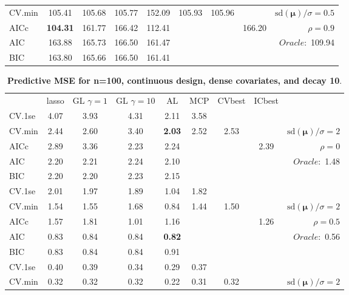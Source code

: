 \begin{table}
\begin{center}
\begin{tabular}{l*{7}{c}|r}
CV.min & 105.41 & 105.68 & 105.77 & 152.09 & 105.93 & 105.96 & & $\mathrm{sd}(\mathbf{\mu})/\sigma=0.5$ \\
AICc & {\bf 104.31} & 161.77 & 166.42 & 112.41 & & & 166.20 &  $\rho=0.9$ \\
AIC & 163.88 & 165.73 & 166.50 & 161.47 & & & &  \multirow{2}{*}{$Oracle: $ 109.94} \\
BIC & 163.80 & 165.66 & 166.50 & 161.41 & & & &  \\
 \hline 
\end{tabular}
\end{center}
\vspace{-1cm}
\end{table}




\clearpage
\begin{table}\vspace{-.5cm}
\caption[l]{ { \bf Predictive MSE for n=100, continuous design, 
dense covariates, and  decay  10}.}
\vspace{-.5cm}
\footnotesize{}
\begin{center}
\begin{tabular}{l*{7}{c}|r}
 & lasso & GL $\gamma=1$ & GL $\gamma=10$ & AL & MCP  & CVbest & ICbest  \\
\cline{1-9}
CV.1se & 4.07 & 3.93 & 4.31 & 2.11 & 3.58 & & & \\
CV.min & 2.44 & 2.60 & 3.40 & {\bf 2.03} & 2.52 & 2.53 & & $\mathrm{sd}(\mathbf{\mu})/\sigma=2$ \\
AICc & 2.89 & 3.36 & 2.23 & 2.24 & & & 2.39 &  $\rho=0$ \\
AIC & 2.20 & 2.21 & 2.24 & 2.10 & & & &  \multirow{2}{*}{$Oracle: $ 1.48} \\
BIC & 2.20 & 2.20 & 2.23 & 2.15 & & & &  \\
 \hline 
CV.1se & 2.01 & 1.97 & 1.89 & 1.04 & 1.82 & & & \\
CV.min & 1.54 & 1.55 & 1.68 & 0.84 & 1.44 & 1.50 & & $\mathrm{sd}(\mathbf{\mu})/\sigma=2$ \\
AICc & 1.57 & 1.81 & 1.01 & 1.16 & & & 1.26 &  $\rho=0.5$ \\
AIC & 0.83 & 0.84 & 0.84 & {\bf 0.82} & & & &  \multirow{2}{*}{$Oracle: $ 0.56} \\
BIC & 0.83 & 0.84 & 0.84 & 0.91 & & & &  \\
 \hline 
CV.1se & 0.40 & 0.39 & 0.34 & 0.29 & 0.37 & & & \\
CV.min & 0.32 & 0.32 & 0.32 & 0.22 & 0.31 & 0.32 & & $\mathrm{sd}(\mathbf{\mu})/\sigma=2$ \\

\end{tabular}
\end{center}
\end{table}
